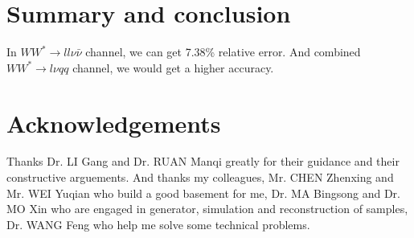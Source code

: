 \documentclass[11pt,a4paper]{cepcnote}
\begin{document}
%
%
%

%
%
\section{Summary and conclusion}
In $WW^* \rightarrow ll\nu\bar{\nu}$ channel, we can get 7.38\% relative error.
And combined $WW^* \rightarrow l\nu qq$ channel, we would get a higher accuracy.
%
%
%

%

\section{Acknowledgements}

Thanks Dr. LI Gang and Dr. RUAN Manqi greatly for their guidance and their constructive arguements.
And thanks my colleagues, Mr. CHEN Zhenxing and Mr. WEI Yuqian who build a good basement for me, 
Dr. MA Bingsong and Dr. MO Xin who are engaged in generator, simulation and reconstruction of samples, 
Dr. WANG Feng who help me solve some technical problems.
\end{document}
